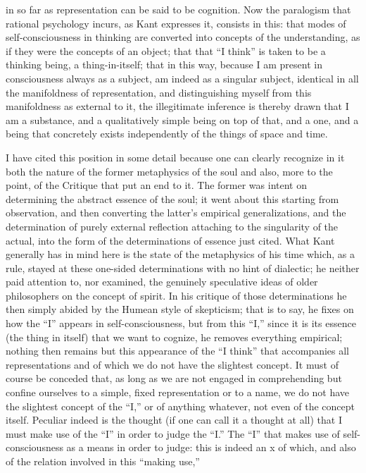 in so far as representation can be said to be cognition.
Now the paralogism that rational psychology incurs,
as Kant expresses it, consists in this:
that modes of self-consciousness in thinking are
converted into concepts of the understanding,
as if they were the concepts of an object;
that that “I think” is taken to be a thinking being, a thing-in-itself;
that in this way, because I am present
in consciousness always as a subject,
am indeed as a singular subject,
identical in all the manifoldness of representation,
and distinguishing myself from this manifoldness as external to it,
the illegitimate inference is thereby drawn that I am a substance,
and a qualitatively simple being on top of that,
and a one, and a being that concretely exists
independently of the things of space and time.

I have cited this position in some detail
because one can clearly recognize in it
both the nature of the former metaphysics of the soul
and also, more to the point, of the Critique that put an end to it.
The former was intent on determining the abstract essence of the soul;
it went about this starting from observation,
and then converting the latter's empirical generalizations,
and the determination of purely external reflection
attaching to the singularity of the actual,
into the form of the determinations of essence just cited.
What Kant generally has in mind here is
the state of the metaphysics of his time
which, as a rule, stayed at these one-sided determinations
with no hint of dialectic;
he neither paid attention to, nor examined,
the genuinely speculative ideas of older
philosophers on the concept of spirit.
In his critique of those determinations he then
simply abided by the Humean style of skepticism;
that is to say, he fixes on how the “I” appears in self-consciousness,
but from this “I,” since it is its essence
(the thing in itself) that we want to cognize,
he removes everything empirical;
nothing then remains but this appearance of the “I think”
that accompanies all representations
and of which we do not have the slightest concept.
It must of course be conceded that,
as long as we are not engaged in comprehending
but confine ourselves to a simple, fixed representation or to a name,
we do not have the slightest concept of the “I,”
or of anything whatever, not even of the concept itself.
Peculiar indeed is the thought
(if one can call it a thought at all)
that I must make use of the “I” in order to judge the “I.”
The “I” that makes use of self-consciousness
as a means in order to judge:
this is indeed an x of which,
and also of the relation involved in this “making use,”
